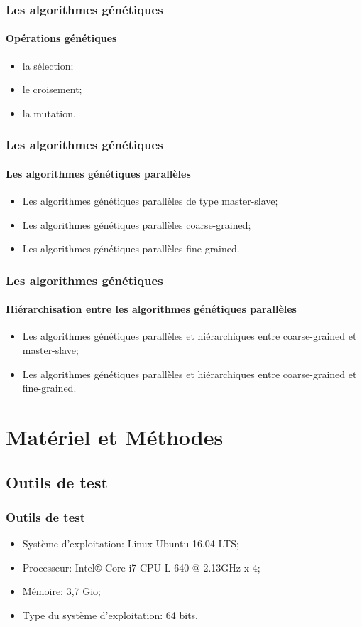 \documentclass[11pt]{beamer}
\begin{document}
 
 \begin{frame}
 \frametitle{Les algorithmes génétiques}
 \framesubtitle{Opérations génétiques}
 
 	\begin{itemize}
 		\item la sélection;
 		\item le croisement;
 		\item la mutation.
 	\end{itemize}
 \end{frame}
 
 \begin{frame}
 \frametitle{Les algorithmes génétiques}
 \framesubtitle{Les algorithmes génétiques parallèles}
 
 	\begin{itemize}
 		\item Les algorithmes génétiques parallèles de type master-slave;
 		\item Les algorithmes génétiques parallèles coarse-grained;
 		\item Les algorithmes génétiques parallèles fine-grained.
 	\end{itemize}
 \end{frame}
 
 \begin{frame}
 \frametitle{Les algorithmes génétiques}
 \framesubtitle{Hiérarchisation entre les algorithmes génétiques parallèles}
 
 	\begin{itemize}
 		\item Les algorithmes génétiques parallèles et hiérarchiques entre coarse-grained et master-slave;
 		\item Les algorithmes génétiques parallèles et hiérarchiques entre coarse-grained et fine-grained.
 	\end{itemize}
 \end{frame}
 
 \section{Matériel et Méthodes}
 \subsection{Outils de test}
 \begin{frame}
 \frametitle{Outils de test}
 
 	\begin{itemize}
 		\item Système d'exploitation: Linux Ubuntu 16.04 LTS; 
		\item Processeur: Intel®  Core  i7 CPU L 640 @ 2.13GHz x 4; 
		\item Mémoire: 3,7 Gio;
		\item Type du système d'exploitation: 64 bits.
 	\end{itemize}
 \end{frame}
 
\end{document}
